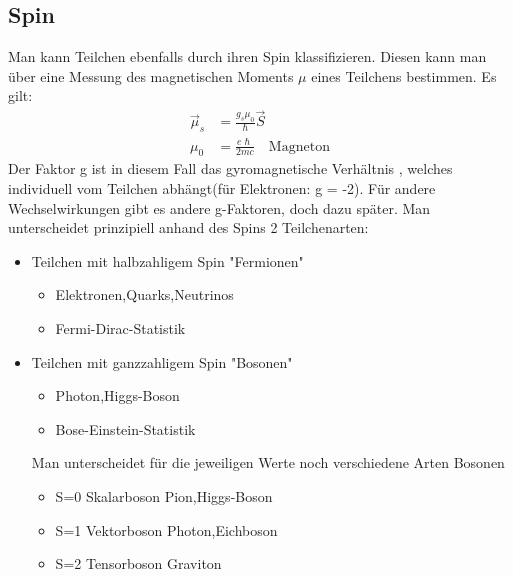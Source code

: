 \documentclass[Ex4_Zusammenfassung.tex]{subfiles}
\begin{document}
\subsection{Spin}
Man kann Teilchen ebenfalls durch ihren Spin klassifizieren. 
Diesen kann man über eine Messung des magnetischen Moments $ \mu $ eines Teilchens bestimmen. Es gilt: 
\begin{align}
\vec \mu_{s} &= \frac{g_s \mu_0 } {\hslash} \vec S \\
\mu_{0} &= \frac{e \hslash}{2mc} \quad \text{Magneton}
\end{align}
Der Faktor g ist in diesem Fall das gyromagnetische Verhältnis , welches individuell vom Teilchen abhängt(für Elektronen: g = -2). Für andere Wechselwirkungen gibt es andere g-Faktoren, doch dazu später.\newline
Man unterscheidet prinzipiell anhand des Spins 2 Teilchenarten: 
\begin{itemize}
\item Teilchen mit halbzahligem Spin "Fermionen" 
						\begin{itemize}
						\item Elektronen,Quarks,Neutrinos
						\item Fermi-Dirac-Statistik
						\end{itemize}
\item Teilchen mit ganzzahligem Spin "Bosonen"
						\begin{itemize}
						\item Photon,Higgs-Boson
						\item Bose-Einstein-Statistik
						\end{itemize}
	Man unterscheidet für die jeweiligen Werte noch verschiedene Arten Bosonen
						\begin{itemize}
						\item S=0 \qquad Skalarboson \qquad Pion,Higgs-Boson
						\item S=1 \qquad Vektorboson \qquad Photon,Eichboson
						\item S=2 \qquad Tensorboson \qquad Graviton
						\end{itemize}
\end{itemize} 
\end{document}
